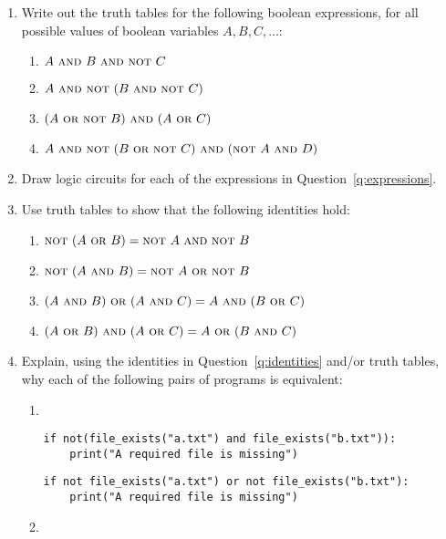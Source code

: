 \documentclass{../../../fal_assignment}
\newcommand{\OP}[1]{\ \textsc{#1}\ }
\newcommand{\OPand}{\OP{and}}
\newcommand{\OPor}{\OP{or}}
\newcommand{\OPnot}{\textsc{not}\ }
\begin{document}
\begin{enumerate}
    \setlength\itemsep{1em}
    \item \label{q:expressions} Write out the truth tables for the following boolean expressions, for all possible values of boolean variables
        $A, B, C, \dots$:
        \begin{enumerate}
            \item $A \OPand B \OPand \OPnot C$
            \item $A \OPand \OPnot(B \OPand \OPnot C)$
            \item $(A \OPor \OPnot B) \OPand (A \OPor C)$
            \item $A \OPand \OPnot (B \OPor \OPnot C) \OPand (\OPnot A \OPand D)$
        \end{enumerate}
    \item Draw logic circuits for each of the expressions in Question~\ref{q:expressions}.
    \item \label{q:identities} Use truth tables to show that the following identities hold:
        \begin{enumerate}
            \item $\OPnot (A \OPor B) = \OPnot A \OPand \OPnot B$
            \item $\OPnot (A \OPand B) = \OPnot A \OPor \OPnot B$
            \item $(A \OPand B) \OPor (A \OPand C) = A \OPand (B \OPor C)$
            \item $(A \OPor B) \OPand (A \OPor C) = A \OPor (B \OPand C)$
        \end{enumerate}
    \item Explain, using the identities in Question~\ref{q:identities} and/or truth tables,    
        why each of the following pairs of programs is equivalent:
        \begin{enumerate}
            \item {\ }
                \begin{lstlisting}
if not(file_exists("a.txt") and file_exists("b.txt")):
    print("A required file is missing")
                \end{lstlisting}
                \begin{lstlisting}
if not file_exists("a.txt") or not file_exists("b.txt"):
    print("A required file is missing")
                \end{lstlisting}
            \item {\ }
                \begin{lstlisting}

\end{lstlisting}
\end{enumerate}
\end{enumerate}
\end{document}
